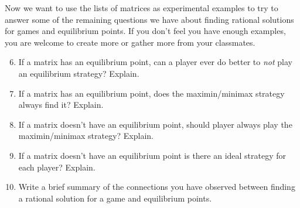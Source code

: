 Now we want to use the lists of matrices as experimental examples to try to answer some of the remaining questions we have about finding rational solutions for games and equilibrium points. If you don't feel you have enough examples, you are welcome to create more or gather more from your classmates.

\begin{enumerate}
\setcounter{enumi}{5}

\item If a matrix has an equilibrium point, can a player ever do better to {\it not} play an equilibrium strategy? Explain.%

\item If a matrix has an equilibrium point, does the maximin/minimax strategy always find it? Explain.

\item If a matrix doesn't have an equilibrium point, should  player always play the maximin/minimax strategy? Explain.

\item If a matrix doesn't have an equilibrium point is there an ideal strategy for each player? Explain.

\item Write a brief summary of the connections you have observed between finding a rational solution for a game and equilibrium points. 

\end{enumerate}


%


 